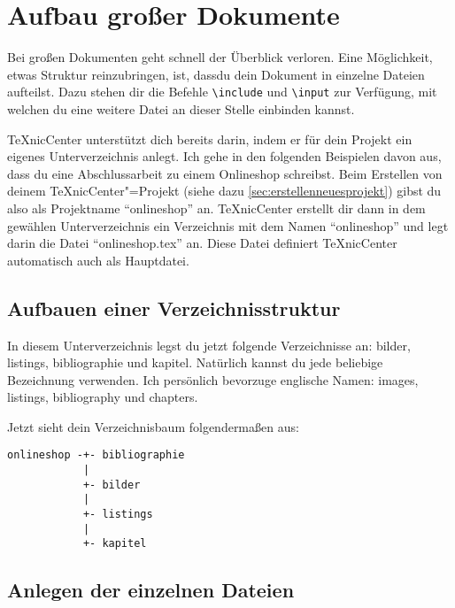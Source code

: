 %
%

\chapter{Aufbau großer Dokumente}
\label{sec:aufbaugrosserdokumente}

Bei großen Dokumenten geht schnell der Überblick verloren. Eine Möglichkeit, etwas Struktur reinzubringen, ist, dassdu dein Dokument in einzelne Dateien aufteilst. Dazu stehen dir die Befehle \texttt{\textbackslash include} und \texttt{\textbackslash input} zur Verfügung, mit welchen du eine weitere Datei an dieser Stelle einbinden kannst.

TeXnicCenter unterstützt dich bereits darin, indem er für dein Projekt ein eigenes Unterverzeichnis anlegt. Ich gehe in den folgenden Beispielen davon aus, dass du eine Abschlussarbeit zu einem Onlineshop schreibst. Beim Erstellen von deinem TeXnicCenter"=Projekt (siehe dazu \vref{sec:erstellenneuesprojekt}) gibst du also als Projektname \enquote{onlineshop} an. TeXnicCenter erstellt dir dann in dem gewählen Unterverzeichnis ein Verzeichnis mit dem Namen \enquote{onlineshop} und legt darin die Datei \enquote{onlineshop.tex} an. Diese Datei definiert TeXnicCenter automatisch auch als Hauptdatei.

\section{Aufbauen einer Verzeichnisstruktur}

In diesem Unterverzeichnis legst du jetzt folgende Verzeichnisse an: bilder, listings, bibliographie und kapitel. Natürlich kannst du jede beliebige Bezeichnung verwenden. Ich persönlich bevorzuge englische Namen: images, listings, bibliography und chapters. 

Jetzt sieht dein Verzeichnisbaum folgendermaßen aus:

\begin{verbatim}
onlineshop -+- bibliographie
            |
            +- bilder
            |
            +- listings
            |
            +- kapitel
\end{verbatim}

\section{Anlegen der einzelnen Dateien}

